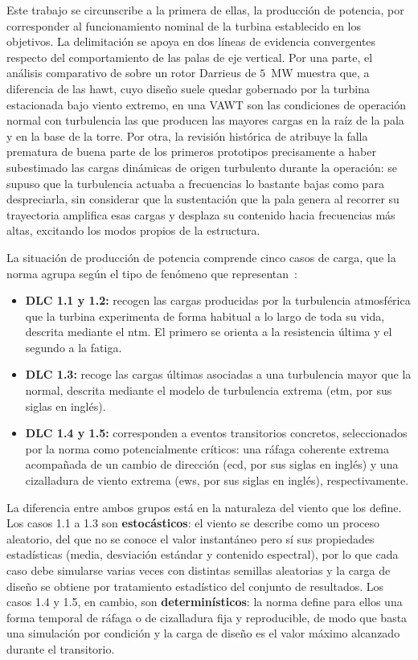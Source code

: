 Este trabajo se circunscribe a la primera de ellas, la producción de potencia, por corresponder al funcionamiento nominal de la turbina establecido en los objetivos. La delimitación se apoya en dos líneas de evidencia convergentes respecto del comportamiento de las palas de eje vertical. Por una parte, el análisis comparativo de \textcite{Galinos2015,Galinos2016} sobre un rotor Darrieus de $5$~MW muestra que, a diferencia de las \gls{hawt}, cuyo diseño suele quedar gobernado por la turbina estacionada bajo viento extremo, en una VAWT son las condiciones de operación normal con turbulencia las que producen las mayores cargas en la raíz de la pala y en la base de la torre. Por otra, la revisión histórica de \textcite{Sutherland2012} atribuye la falla prematura de buena parte de los primeros prototipos precisamente a haber subestimado las cargas dinámicas de origen turbulento durante la operación: se supuso que la turbulencia actuaba a frecuencias lo bastante bajas como para despreciarla, sin considerar que la sustentación que la pala genera al recorrer su trayectoria amplifica esas cargas y desplaza su contenido hacia frecuencias más altas, excitando los modos propios de la estructura.

La situación de producción de potencia comprende cinco casos de carga, que la norma agrupa según el tipo de fenómeno que representan~\parencite{IEC61400-1}:

\begin{itemize}
    \item \textbf{DLC 1.1 y 1.2:} recogen las cargas producidas por la turbulencia atmosférica que la turbina experimenta de forma habitual a lo largo de toda su vida, descrita mediante el \gls{ntm}. El primero se orienta a la resistencia última y el segundo a la fatiga.
    \item \textbf{DLC 1.3:} recoge las cargas últimas asociadas a una turbulencia mayor que la normal, descrita mediante el modelo de turbulencia extrema (\gls{etm}, por sus siglas en inglés).
    \item \textbf{DLC 1.4 y 1.5:} corresponden a eventos transitorios concretos, seleccionados por la norma como potencialmente críticos: una ráfaga coherente extrema acompañada de un cambio de dirección (\gls{ecd}, por sus siglas en inglés) y una cizalladura de viento extrema (\gls{ews}, por sus siglas en inglés), respectivamente.
\end{itemize}

La diferencia entre ambos grupos está en la naturaleza del viento que los define. Los casos 1.1 a 1.3 son \textbf{estocásticos}: el viento se describe como un proceso aleatorio, del que no se conoce el valor instantáneo pero sí sus propiedades estadísticas (media, desviación estándar y contenido espectral), por lo que cada caso debe simularse varias veces con distintas semillas aleatorias y la carga de diseño se obtiene por tratamiento estadístico del conjunto de resultados. Los casos 1.4 y 1.5, en cambio, son \textbf{determinísticos}: la norma define para ellos una forma temporal de ráfaga o de cizalladura fija y reproducible, de modo que basta una simulación por condición y la carga de diseño es el valor máximo alcanzado durante el transitorio.

